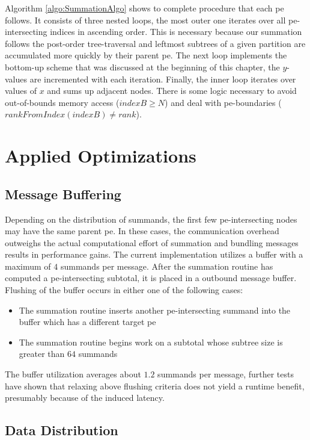 Algorithm \ref{algo:SummationAlgo} shows to complete procedure that each \gls{pe} follows. It consists of three nested loops, the most outer one
iterates over all \gls{pe}-intersecting indices in ascending order.
This is necessary because our summation follows the post-order tree-traversal and leftmost subtrees of a given partition are accumulated more quickly
by their parent \gls{pe}. The next loop implements the bottom-up scheme that was discussed at the beginning of this chapter, the $y$-values are
incremented with each iteration. Finally, the inner loop iterates over values of $x$ and sums up adjacent nodes. There is some logic necessary to avoid
out-of-bounds memory access ($indexB \geq N$) and deal with \gls{pe}-boundaries ($rankFromIndex(indexB) \neq rank$).

\section{Applied Optimizations}
\label{sec:AppliedOptimizations}

\subsection{Message Buffering}
\label{sec:MessageBuffering}

Depending on the distribution of summands, the first few \gls{pe}-intersecting nodes may have the same parent \gls{pe}. In these cases, the communication
overhead outweighs the actual computational effort of summation and bundling messages results in performance gains. The current implementation
utilizes a buffer with a maximum of $4$ summands per message. After the summation routine has computed a \gls{pe}-intersecting subtotal, it is placed
in a outbound message buffer. Flushing of the buffer occurs in either one of the following cases: \begin{itemize}
\item The summation routine inserts another \gls{pe}-intersecting summand into the buffer which has a different target \gls{pe}
\item The summation routine begins work on a subtotal whose subtree size is greater than $64$ summands
\end{itemize}

The buffer utilization averages about $1.2$ summands per message, further tests have shown that relaxing above flushing criteria does not
yield a runtime benefit, presumably because of the induced latency.

\subsection{Data Distribution}
\label{sec:DataDistribution}

